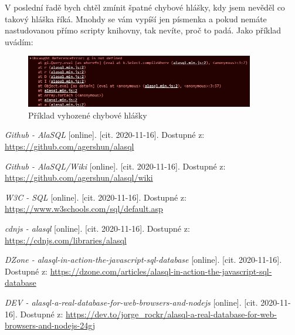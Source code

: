 \documentclass[a4, titlepage]{article}
\begin{document}
V poslední řadě bych chtěl zmínit špatné chybové hlášky, kdy jsem nevěděl co takový hláška říká. Mnohdy se vám vypíší jen písmenka a pokud nemáte nastudovanou přímo scripty knihovny, tak nevíte, proč to padá. Jako příklad uvádím:
\begin{figure}[h]
    \centering
    \includegraphics[width=10cm]{error}
    \caption{Příklad vyhozené chybové hlášky}
\end{figure}


\newpage
\begin{thebibliography}{9}
\textit{Github - AlaSQL} [online]. [cit. 2020-11-16]. Dostupné z: 
\url{https://github.com/agershun/alasql}

\textit{Github - AlaSQL/Wiki} [online]. [cit. 2020-11-16]. Dostupné z: 
\url{https://github.com/agershun/alasql/wiki}

\textit{W3C - SQL} [online]. [cit. 2020-11-16]. Dostupné z: 
\url{https://www.w3schools.com/sql/default.asp}

\textit{cdnjs - alasql} [online]. [cit. 2020-11-16]. Dostupné z: 
\url{https://cdnjs.com/libraries/alasql}

\textit{DZone - alasql-in-action-the-javascript-sql-database} [online]. [cit. 2020-11-16]. Dostupné z: 
\url{https://dzone.com/articles/alasql-in-action-the-javascript-sql-database}

\textit{DEV - alasql-a-real-database-for-web-browsers-and-nodejs} [online]. [cit. 2020-11-16]. Dostupné z: 
\url{https://dev.to/jorge_rockr/alasql-a-real-database-for-web-browsers-and-nodejs-24gj}

\end{thebibliography}

\newpage
\listoffigures
\end{document}
